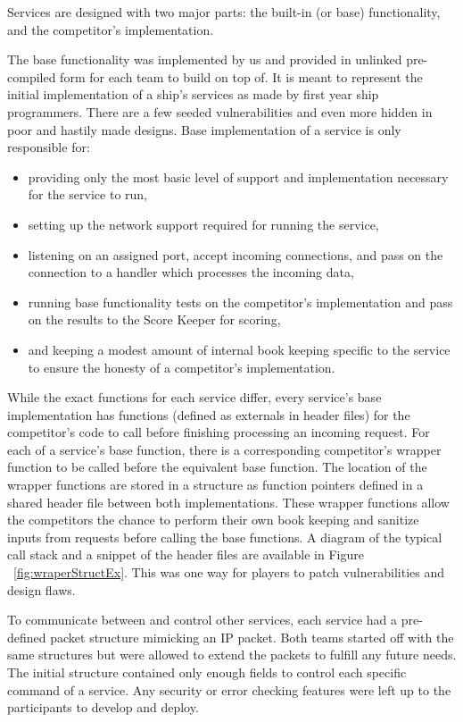 \documentclass[10pt]{article}
\begin{document}
Services are designed with two major parts: the built-in (or base)
functionality, and the competitor's implementation.

The base functionality was implemented by us and provided in unlinked
pre-compiled form for each team to build on top of. It is meant to represent the
initial implementation of a ship's services as made by first year ship
programmers. There are a few seeded vulnerabilities and even more hidden in poor
and hastily made designs. Base implementation of a service is only responsible
for:

\begin{itemize}
    \item providing only the most basic level of support and implementation
    necessary for the service to run, 
    \item setting up the network support required for running the service,
    \item listening on an assigned port, accept incoming connections, and pass
    on the connection to a handler which processes the incoming data,
    \item running base functionality tests on the competitor's implementation and
    pass on the results to the Score Keeper for scoring,
    \item and keeping a modest amount of internal book keeping specific to the
    service to ensure the honesty of a competitor's implementation.
\end{itemize}

While the exact functions for each service differ, every service's base
implementation has functions (defined as externals in header files)
for the competitor's code to call before finishing processing an incoming
request. For each of a service's base function, there is a corresponding
competitor's wrapper function to be called before the equivalent base function.
The location of the wrapper functions are stored in a structure as function
pointers defined in a shared header file between both implementations. These
wrapper functions allow the competitors the chance to perform their own book
keeping and sanitize inputs from requests before calling the base functions. A
diagram of the typical call stack and a snippet of the header files are
available in Figure ~\ref{fig:wraperStructEx}. This was one way for players to
patch vulnerabilities and design flaws.

To communicate between and control other services, each service had a
pre-defined packet structure mimicking an IP packet. Both teams started off with
the same structures but were allowed to extend the packets to fulfill any
future needs. The initial structure contained only enough fields to control each
specific command of a service. Any security or error checking features were left
up to the participants to develop and deploy. 
\end{document}
